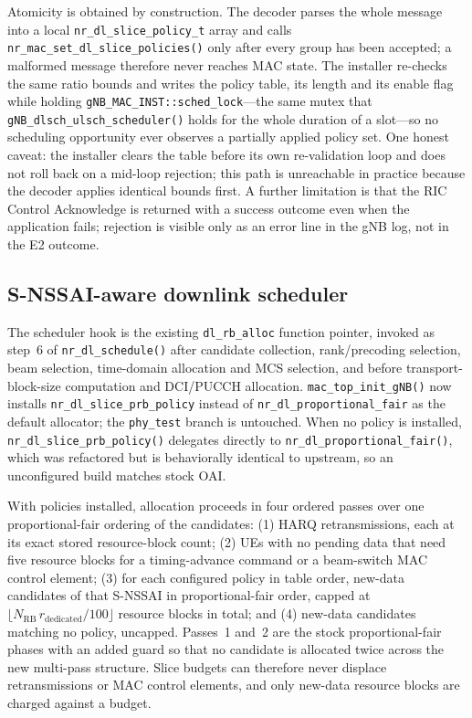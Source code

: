 Atomicity is obtained by construction. The decoder parses the whole message into a local \texttt{nr\_dl\_slice\_policy\_t} array and calls \texttt{nr\_mac\_set\_dl\_slice\_policies()} only after every group has been accepted; a malformed message therefore never reaches MAC state. The installer re-checks the same ratio bounds and writes the policy table, its length and its enable flag while holding \texttt{gNB\_MAC\_INST::sched\_lock}---the same mutex that \texttt{gNB\_dlsch\_ulsch\_scheduler()} holds for the whole duration of a slot---so no scheduling opportunity ever observes a partially applied policy set. One honest caveat: the installer clears the table before its own re-validation loop and does not roll back on a mid-loop rejection; this path is unreachable in practice because the decoder applies identical bounds first. A further limitation is that the RIC Control Acknowledge is returned with a success outcome even when the application fails; rejection is visible only as an error line in the gNB log, not in the E2 outcome.

\subsection{S-NSSAI-aware downlink scheduler}
The scheduler hook is the existing \texttt{dl\_rb\_alloc} function pointer, invoked as step~6 of \texttt{nr\_dl\_schedule()} after candidate collection, rank/precoding selection, beam selection, time-domain allocation and MCS selection, and before transport-block-size computation and DCI/PUCCH allocation. \texttt{mac\_top\_init\_gNB()} now installs \texttt{nr\_dl\_slice\_prb\_policy} instead of \texttt{nr\_dl\_proportional\_fair} as the default allocator; the \texttt{phy\_test} branch is untouched. When no policy is installed, \texttt{nr\_dl\_slice\_prb\_policy()} delegates directly to \texttt{nr\_dl\_proportional\_fair()}, which was refactored but is behaviorally identical to upstream, so an unconfigured build matches stock OAI.

With policies installed, allocation proceeds in four ordered passes over one proportional-fair ordering of the candidates: (1) HARQ retransmissions, each at its exact stored resource-block count; (2) UEs with no pending data that need five resource blocks for a timing-advance command or a beam-switch MAC control element; (3) for each configured policy in table order, new-data candidates of that S-NSSAI in proportional-fair order, capped at $\lfloor N_{\mathrm{RB}}\, r_{\mathrm{dedicated}}/100 \rfloor$ resource blocks in total; and (4) new-data candidates matching no policy, uncapped. Passes~1 and~2 are the stock proportional-fair phases with an added guard so that no candidate is allocated twice across the new multi-pass structure. Slice budgets can therefore never displace retransmissions or MAC control elements, and only new-data resource blocks are charged against a budget.

